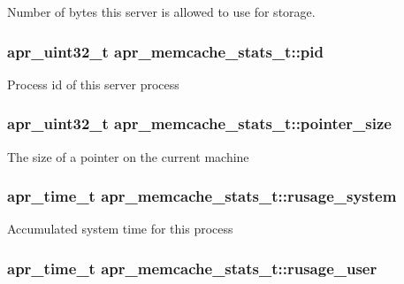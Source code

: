 Number of bytes this server is allowed to use for storage. \hypertarget{structapr__memcache__stats__t_a8ed498f4a6cbfb55312b8b67ce2689d3}{
\subsubsection[{pid}]{\setlength{\rightskip}{0pt plus 5cm}apr\-\_\-uint32\-\_\-t apr\-\_\-memcache\-\_\-stats\-\_\-t\-::pid}}\label{structapr__memcache__stats__t_a8ed498f4a6cbfb55312b8b67ce2689d3}
Process id of this server process \hypertarget{structapr__memcache__stats__t_a01bd7ed7ba82b7a7bf03f9de468fcc2e}{
\subsubsection[{pointer\-\_\-size}]{\setlength{\rightskip}{0pt plus 5cm}apr\-\_\-uint32\-\_\-t apr\-\_\-memcache\-\_\-stats\-\_\-t\-::pointer\-\_\-size}}\label{structapr__memcache__stats__t_a01bd7ed7ba82b7a7bf03f9de468fcc2e}
The size of a pointer on the current machine \hypertarget{structapr__memcache__stats__t_a2eff9899b9cb4ee704fae93af4c5bf76}{
\subsubsection[{rusage\-\_\-system}]{\setlength{\rightskip}{0pt plus 5cm}apr\-\_\-time\-\_\-t apr\-\_\-memcache\-\_\-stats\-\_\-t\-::rusage\-\_\-system}}\label{structapr__memcache__stats__t_a2eff9899b9cb4ee704fae93af4c5bf76}
Accumulated system time for this process \hypertarget{structapr__memcache__stats__t_a4e43e96550407edd29e81ba59706c5b5}{
\subsubsection[{rusage\-\_\-user}]{\setlength{\rightskip}{0pt plus 5cm}apr\-\_\-time\-\_\-t apr\-\_\-memcache\-\_\-stats\-\_\-t\-::rusage\-\_\-user}}\label{structapr__memcache__stats__t_a4e43e96550407edd29e81ba59706c5b5}
